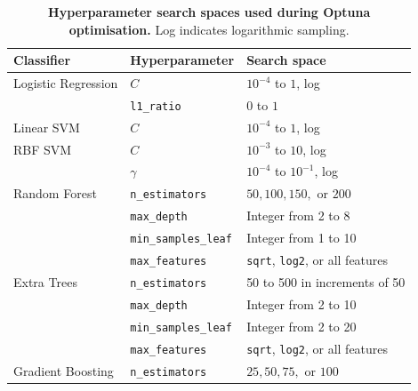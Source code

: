 \documentclass[12pt,twocolumn]{article}
\begin{document}
\begin{table}[htbp]
\centering
\caption{\textbf{Hyperparameter search spaces used during Optuna
optimisation.} Log indicates logarithmic sampling.}
\label{tab:hyperparameter_search_spaces}
\scriptsize
\begin{tabularx}{\textwidth}{p{3.0cm} p{3.4cm} X}
\toprule
\textbf{Classifier} &
\textbf{Hyperparameter} &
\textbf{Search space} \\
\midrule

Logistic Regression
& \(C\)
& \(10^{-4}\) to \(1\), log \\

& \texttt{l1\_ratio}
& \(0\) to \(1\) \\

\midrule

Linear SVM
& \(C\)
& \(10^{-4}\) to \(1\), log \\

\midrule

RBF SVM
& \(C\)
& \(10^{-3}\) to \(10\), log \\

& \(\gamma\)
& \(10^{-4}\) to \(10^{-1}\), log \\

\midrule

Random Forest
& \texttt{n\_estimators}
& \(50, 100, 150,\) or \(200\) \\

& \texttt{max\_depth}
& Integer from 2 to 8 \\

& \texttt{min\_samples\_leaf}
& Integer from 1 to 10 \\

& \texttt{max\_features}
& \texttt{sqrt}, \texttt{log2}, or all features \\

\midrule

Extra Trees
& \texttt{n\_estimators}
& 50 to 500 in increments of 50 \\

& \texttt{max\_depth}
& Integer from 2 to 10 \\

& \texttt{min\_samples\_leaf}
& Integer from 2 to 20 \\

& \texttt{max\_features}
& \texttt{sqrt}, \texttt{log2}, or all features \\

\midrule

Gradient Boosting
& \texttt{n\_estimators}
& \(25, 50, 75,\) or \(100\) \\


\end{tabularx}
\end{table}
\end{document}
